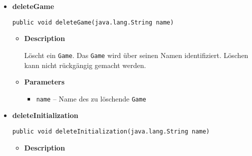 {{{{{{{{\begin{itemize}
{\begin{itemize}
{Löscht eine \texttt{\small Configuration}. Die \texttt{\small Configuration} wird über ihren Namen identifiziert. Löschen kann nicht rückgängig gemacht werden.
}
\item{
{\bf  Parameters}
  \begin{itemize}
   \item{
\texttt{name} -- Name der zu löschenden \texttt{\small Configuration}}
  \end{itemize}
}%
\end{itemize}
}%
\item{ 
\hypertarget{de.sswis.controller.ModelProvider.deleteGame(java.lang.String)}{{\bf  deleteGame}\\}
\begin{lstlisting}[frame=none]
public void deleteGame(java.lang.String name)\end{lstlisting} %
\begin{itemize}
\item{
{\bf  Description}

Löscht ein \texttt{\small Game}. Das \texttt{\small Game} wird über seinen Namen identifiziert. Löschen kann nicht rückgängig gemacht werden.
}
\item{
{\bf  Parameters}
  \begin{itemize}
   \item{
\texttt{name} -- Name des zu löschende \texttt{\small Game}}
  \end{itemize}
}%
\end{itemize}
}%
\item{ 
\hypertarget{de.sswis.controller.ModelProvider.deleteInitialization(java.lang.String)}{{\bf  deleteInitialization}\\}
\begin{lstlisting}[frame=none]
public void deleteInitialization(java.lang.String name)\end{lstlisting} %
\begin{itemize}
\item{
{\bf  Description}

}
\end{itemize}}
\end{itemize}}}}}}}}}
